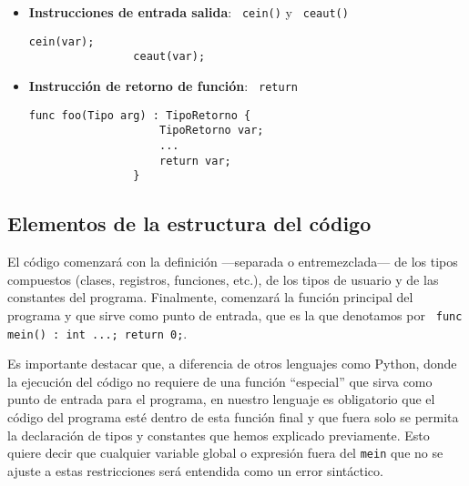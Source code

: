 \documentclass[10pt,a4paper]{article}
\begin{document}
\begin{itemize}
    \item \textbf{Instrucciones de entrada salida}: \texttt{\color{blue} cein()} y \texttt{\color{blue} ceaut()}
    \begin{center}
        \begin{minipage}{\linewidth}
            \begin{lstlisting}[linewidth=0.3\linewidth, gobble=16]
                cein(var);
                ceaut(var);
            \end{lstlisting}
        \end{minipage}
    \end{center}
    
    \item \textbf{Instrucción de retorno de función}: \texttt{\color{blue} return}
    \begin{center}
        \begin{minipage}{\linewidth}
            \begin{lstlisting}[linewidth=0.5\linewidth, gobble=16]
                func foo(Tipo arg) : TipoRetorno {
                    TipoRetorno var;
                    ...
                    return var;
                }
            \end{lstlisting}
        \end{minipage}
    \end{center}

\end{itemize}

\subsection{Elementos de la estructura del código}\label{subsec:Elementos de la estructura del código}
El código comenzará con la definición ---separada o entremezclada--- de los tipos compuestos (clases, registros, funciones, etc.), de los tipos de usuario y de las constantes del programa. Finalmente, comenzará la función principal del programa y que sirve como punto de entrada, que es la que denotamos por \texttt{\color{blue} func mein() : int {...; return 0;}}.

Es importante destacar que, a diferencia de otros lenguajes como Python, donde la ejecución del código no requiere de una función ``especial'' que sirva como punto de entrada para el programa, en nuestro lenguaje es obligatorio que el código del programa esté dentro de esta función final y que fuera solo se permita la declaración de tipos y constantes que hemos explicado previamente. Esto quiere decir que cualquier variable global o expresión fuera del \texttt{mein} que no se ajuste a estas restricciones será entendida como un error sintáctico.
\end{document}
